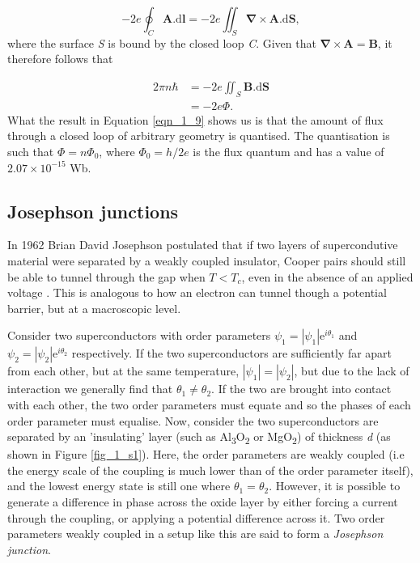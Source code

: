 \begin{equation}
-2e\oint_C \mathbf{A}.\text{d}\mathbf{l} = -2e \iint_S \mathbf{\nabla} \times \mathbf{A}.\text{d}\mathbf{S},
\end{equation} where the surface \textit{S} is bound by the closed loop \textit{C}. Given that $\mathbf{\nabla}\times\mathbf{A}=\mathbf{B}$, it therefore follows that 

\begin{equation}
\begin{aligned}
2\pi n \hbar &=-2e\iint_S \mathbf{B}.\text{d}\mathbf{S} \\
&= -2e\Phi.
\end{aligned} \label{eqn_1_9}
\end{equation} What the result in Equation \ref{eqn_1_9} shows us is that the amount of flux through a closed loop of arbitrary geometry is quantised. The quantisation is such that $\Phi=n\Phi_0$, where $\Phi_0 = h/2e$ is the flux quantum and has a value of $2.07 \times 10^{-15}$ Wb.
\subsection{Josephson junctions}
In 1962 Brian David Josephson postulated that if two layers of supercondutive material were separated by a weakly coupled insulator, Cooper pairs should still be able to tunnel through the gap when $T < T_c$, even in the absence of an applied voltage \citep{Josephson1962}. This is analogous to how an electron can tunnel though a potential barrier, but at a macroscopic level.  

Consider two superconductors with order parameters $\psi_1 = |\psi_1|\text{e}^{i\theta_1}$ and $\psi_2 = |\psi_2|\text{e}^{i\theta_2}$ respectively. If the two superconductors are sufficiently far apart from each other, but at the same temperature, $|\psi_1| = |\psi_2|$, but due to the lack of interaction we generally find that $\theta_1 \neq \theta_2$. If the two are brought into contact with each other, the two order parameters must equate and so the phases of each order parameter must equalise. Now, consider the two superconductors are separated by an 'insulating' layer (such as Al\textsubscript{3}O\textsubscript{2} or MgO\textsubscript{2}) of thickness \textit{d} (as shown in Figure \ref{fig_1_s1}). Here, the order parameters are weakly coupled (i.e the energy scale of the coupling is much lower than of the order parameter itself), and the lowest energy state is still one where $\theta_1 = \theta_2$. However, it is possible to generate a difference in phase across the oxide layer by either forcing a current through the coupling, or applying a potential difference across it. Two order parameters weakly coupled in a setup like this are said to form a \textit{Josephson junction}. 

